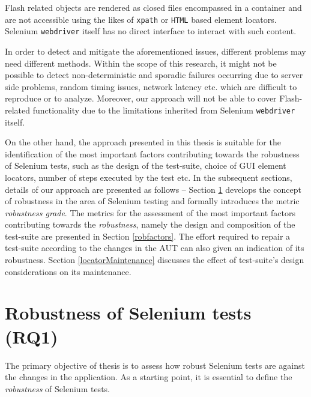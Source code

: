 Flash related objects are rendered as closed files encompassed in a container and are not accessible using the likes of \texttt{xpath} or \texttt{HTML} based element locators. Selenium \texttt{webdriver} itself has no direct interface to interact with such content. 

In order to detect and mitigate the aforementioned issues, different problems may need different methods. Within the scope of this research, it might not be possible to detect non-deterministic and sporadic failures occurring due to server side problems, random timing issues, network latency etc. which are difficult to reproduce or to analyze. Moreover, our approach will not be able to cover Flash-related functionality due to the limitations inherited from Selenium \texttt{webdriver} itself.

On the other hand, the approach presented in this thesis is suitable for the identification of the most important factors contributing towards the robustness of Selenium tests, such as the design of the test-suite, choice of GUI element locators, number of steps executed by the test etc. In the subsequent sections, details of our approach are presented as follows -- Section \ref{robustnessOfSeleniumTests} develops the concept of robustness in the area of Selenium testing and formally introduces the metric \textit{robustness grade}. The metrics for the assessment of the most important factors contributing towards the \textit{robustness}, namely the design and composition of the test-suite are presented in Section \ref{robfactors}. The effort required to repair a test-suite according to the changes in the AUT can also given an indication of its robustness. Section \ref{locatorMaintenance} discusses the effect of test-suite's design considerations on its maintenance. 

\section{Robustness of Selenium tests (RQ1)}
\label{robustnessOfSeleniumTests}

The primary objective of thesis is to assess how robust Selenium tests are against the changes in the application. As a starting point, it is essential to define the \textit{robustness} of Selenium tests. 

